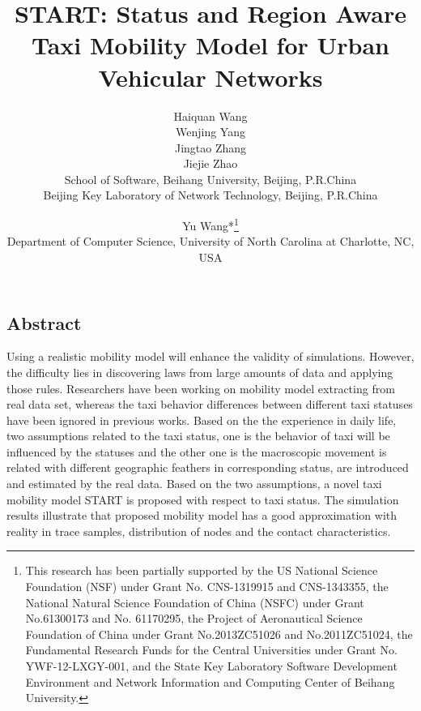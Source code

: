 \documentclass[camera-ready,twocolumn,10pt]{IEEEtran}
\begin{document}
\date{}

\title{\Large \bf START: Status and Region Aware Taxi Mobility Model for Urban Vehicular Networks}

\author{
{\rm Haiquan Wang}\\
{\rm Wenjing Yang}\\
{\rm Jingtao Zhang}\\
{\rm Jiejie Zhao}\\
School of Software, Beihang University, Beijing, P.R.China\\
Beijing Key Laboratory of Network Technology, Beijing, P.R.China\\
\and
{\rm Yu Wang*\thanks{
 This research has been partially supported by the US National Science Foundation (NSF) under Grant No. CNS-1319915 and CNS-1343355, the National Natural Science Foundation of China (NSFC) under Grant No.61300173 and No. 61170295, the Project of Aeronautical Science Foundation of China under Grant No.2013ZC51026 and No.2011ZC51024, the Fundamental Research Funds for the Central Universities under Grant No. YWF-12-LXGY-001, and the State Key Laboratory Software Development Environment and Network Information and Computing Center of Beihang University.}}\\
Department of Computer Science, University of North Carolina at Charlotte, NC, USA\\
} %

\maketitle


\subsection*{Abstract}
Using a realistic mobility model will enhance the validity of simulations. However, the difficulty lies in discovering laws from large amounts of data and applying those rules. Researchers have been working on mobility model extracting from real data set, whereas the taxi behavior differences between different taxi statuses have been ignored in previous works.
Based on the the experience in daily life, two assumptions related to the taxi status, one is the behavior of taxi will be influenced by the statuses and the other one is the macroscopic movement is related with different geographic feathers in corresponding status, are introduced and estimated by the real data. Based on the two assumptions, a novel taxi mobility model START is proposed with respect to taxi status. The simulation results illustrate that proposed mobility model has a good approximation with reality in trace samples, distribution of nodes and the contact characteristics.
\end{document}
